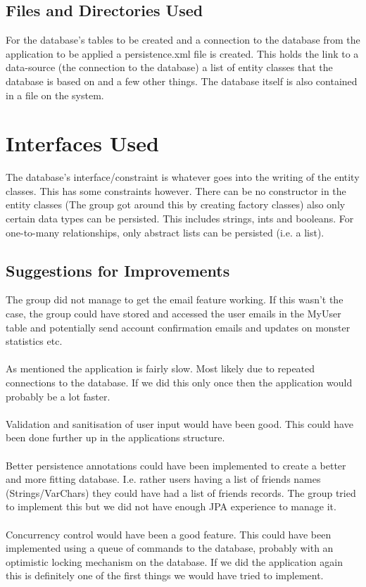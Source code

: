 \documentclass[titlepage]{article}
\begin{document}
{\subsection{Files and Directories Used}
For the database’s tables to be created and a connection to the database from the application to be applied a persistence.xml file is created. This holds the link to a data-source (the connection to the database) a list of entity classes that the database is based on and a few other things. The database itself is also contained in a file on the system.
\section{Interfaces Used}
The database’s interface/constraint is whatever goes into the writing of the entity classes. This has some constraints however. There can be no constructor in the entity classes (The group got around this by creating factory classes) also only certain data types can be persisted. This includes strings, ints and booleans. For one-to-many relationships, only abstract lists can be persisted (i.e. a list).
\subsection {Suggestions for Improvements}
The group did not manage to get the email feature working. If this wasn't the case, the group could have stored and accessed the user emails in the MyUser table and potentially send account confirmation emails and updates on monster statistics etc.
\\
\\
As mentioned the application is fairly slow. Most likely due to repeated connections to the database. If we did this only once then the application would probably be a lot faster.
\\
\\
Validation and sanitisation of user input would have been good. This could have been done further up in the applications structure.
\\
\\
Better persistence annotations could have been implemented to create a better and more fitting database. I.e. rather users having a list of friends names (Strings/VarChars) they could have had a list of friends records. The group tried to implement this but we did not have enough JPA experience to manage it.
\\
\\
Concurrency control would have been a good feature. This could have been implemented using a queue of commands to the database, probably with an optimistic locking mechanism on the database. If we did the application again this is definitely one of the first things we would have tried to implement.
}
\end{document}
